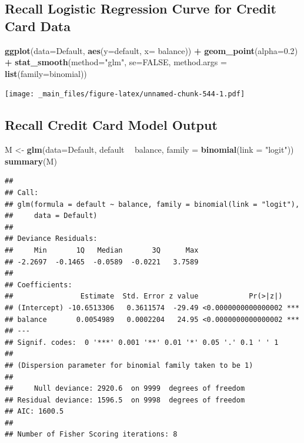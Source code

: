 \documentclass[]{book}
\newenvironment{Shaded}{\begin{snugshade}}{\end{snugshade}}
\newcommand{\KeywordTok}[1]{\textcolor[rgb]{0.13,0.29,0.53}{\textbf{#1}}}
\newcommand{\DataTypeTok}[1]{\textcolor[rgb]{0.13,0.29,0.53}{#1}}
\newcommand{\FloatTok}[1]{\textcolor[rgb]{0.00,0.00,0.81}{#1}}
\newcommand{\StringTok}[1]{\textcolor[rgb]{0.31,0.60,0.02}{#1}}
\newcommand{\OtherTok}[1]{\textcolor[rgb]{0.56,0.35,0.01}{#1}}
\newcommand{\OperatorTok}[1]{\textcolor[rgb]{0.81,0.36,0.00}{\textbf{#1}}}
\newcommand{\NormalTok}[1]{#1}
\begin{document}
\subsection{Recall Logistic Regression Curve for Credit Card
Data}\label{recall-logistic-regression-curve-for-credit-card-data}

\begin{Shaded}
\begin{Highlighting}[]
\KeywordTok{ggplot}\NormalTok{(}\DataTypeTok{data=}\NormalTok{Default, }\KeywordTok{aes}\NormalTok{(}\DataTypeTok{y=}\NormalTok{default, }\DataTypeTok{x=}\NormalTok{ balance)) }\OperatorTok{+}\StringTok{ }\KeywordTok{geom_point}\NormalTok{(}\DataTypeTok{alpha=}\FloatTok{0.2}\NormalTok{) }\OperatorTok{+}\StringTok{ }
\StringTok{  }\KeywordTok{stat_smooth}\NormalTok{(}\DataTypeTok{method=}\StringTok{"glm"}\NormalTok{, }\DataTypeTok{se=}\OtherTok{FALSE}\NormalTok{, }\DataTypeTok{method.args =} \KeywordTok{list}\NormalTok{(}\DataTypeTok{family=}\NormalTok{binomial)) }
\end{Highlighting}
\end{Shaded}

\texttt{[image: \_main\_files/figure-latex/unnamed-chunk-544-1.pdf]}

\subsection{Recall Credit Card Model
Output}\label{recall-credit-card-model-output}

\begin{Shaded}
\begin{Highlighting}[]
\NormalTok{M <-}\StringTok{ }\KeywordTok{glm}\NormalTok{(}\DataTypeTok{data=}\NormalTok{Default, default }\OperatorTok{~}\StringTok{ }\NormalTok{balance, }\DataTypeTok{family =} \KeywordTok{binomial}\NormalTok{(}\DataTypeTok{link =} \StringTok{"logit"}\NormalTok{))}
\KeywordTok{summary}\NormalTok{(M)}
\end{Highlighting}
\end{Shaded}

\begin{verbatim}
## 
## Call:
## glm(formula = default ~ balance, family = binomial(link = "logit"), 
##     data = Default)
## 
## Deviance Residuals: 
##     Min       1Q   Median       3Q      Max  
## -2.2697  -0.1465  -0.0589  -0.0221   3.7589  
## 
## Coefficients:
##                Estimate  Std. Error z value            Pr(>|z|)    
## (Intercept) -10.6513306   0.3611574  -29.49 <0.0000000000000002 ***
## balance       0.0054989   0.0002204   24.95 <0.0000000000000002 ***
## ---
## Signif. codes:  0 '***' 0.001 '**' 0.01 '*' 0.05 '.' 0.1 ' ' 1
## 
## (Dispersion parameter for binomial family taken to be 1)
## 
##     Null deviance: 2920.6  on 9999  degrees of freedom
## Residual deviance: 1596.5  on 9998  degrees of freedom
## AIC: 1600.5
## 
## Number of Fisher Scoring iterations: 8
\end{verbatim}
\end{document}
